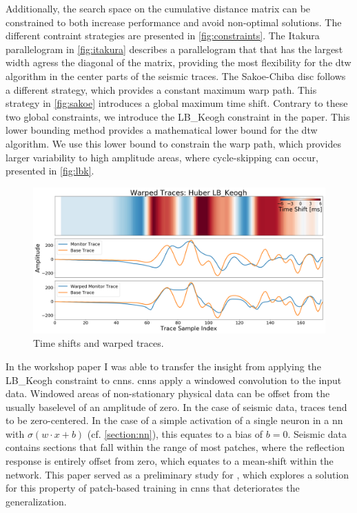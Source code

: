 Additionally, the search space on the cumulative distance matrix can be constrained to both increase performance and avoid non-optimal solutions. The different contraint strategies are presented in \cref{fig:constraints}. The Itakura parallelogram \citep{Itakura1975} in \cref{fig:itakura} describes a parallelogram that that has the largest width agress the diagonal of the matrix, providing the most flexibility for the \ac{dtw} algorithm in the center parts of the seismic traces. The Sakoe-Chiba disc \citep{Sakoe1978} follows a different strategy, which provides a constant maximum warp path. This strategy in \cref{fig:sakoe} introduces a global maximum time shift. Contrary to these two global constraints, we introduce the LB\_Keogh \citep{keogh2005exact} constraint in the paper. This lower bounding method provides a mathematical lower bound for the \ac{dtw} algorithm. We use this lower bound to constrain the warp path, which provides larger variability to high amplitude areas, where cycle-skipping can occur, presented in \cref{fig:lbk}. 

\begin{figure}[!ht]
    \centering
    \includegraphics[width=\textwidth]{figures/time_shift_huber_lb_keogh.png}
    \caption{Time shifts and warped traces.}
    \label{fig:time-shifts-warped}
\end{figure}

In the workshop paper  I was able to transfer the insight from applying the LB\_Keogh constraint to \aclp{cnn}. \acp{cnn} apply a windowed convolution to the input data. Windowed areas of non-stationary physical data can be offset from the usually baselevel of an amplitude of zero. In the case of seismic data, traces tend to be zero-centered. In the case of a simple activation of a single neuron in a \ac{nn} with $\sigma(w\cdot x + b)$ (cf. \cref{section:nn}), this equates to a bias of $b=0$. Seismic data contains sections that fall within the range of most patches, where the reflection response is entirely offset from zero, which equates to a mean-shift within the network. This paper served as a preliminary study for \citet{dramsch2019complex}, which explores a solution for this property of patch-based training in \acp{cnn} that deteriorates the generalization.

